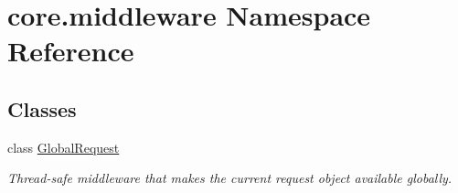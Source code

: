 \hypertarget{namespacecore_1_1middleware}{\section{core.\-middleware Namespace Reference}
\label{namespacecore_1_1middleware}
}
\subsection*{Classes}
\begin{DoxyCompactItemize}
\item 
class \hyperlink{classcore_1_1middleware_1_1GlobalRequest}{Global\-Request}
\begin{DoxyCompactList}\small\item\em Thread-\/safe middleware that makes the current request object available globally. \end{DoxyCompactList}\end{DoxyCompactItemize}
